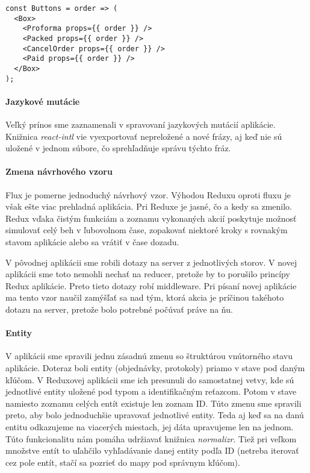 \begin{lstlisting}[caption=Pole komponentov v JavaScripte s použitím knižnice Redux]
const Buttons = order => (
  <Box>
    <Proforma props={{ order }} />
    <Packed props={{ order }} />
    <CancelOrder props={{ order }} />
    <Paid props={{ order }} />
  </Box>
);
\end{lstlisting}

\paragraph{Jazykové mutácie}
Veľký prínos sme zaznamenali v spravovaní jazykových mutácií aplikácie. Knižnica \emph{react-intl} vie vyexportovať nepreložené a nové frázy, aj keď nie sú uložené v jednom súbore, čo sprehľadňuje správu týchto fráz.

\paragraph{Zmena návrhového vzoru}
Flux je pomerne jednoduchý návrhový vzor. Výhodou Reduxu oproti fluxu je však ešte viac prehladná aplikácia. Pri Reduxe je jasné, čo a kedy sa zmenilo. Redux vďaka čistým funkciám a zoznamu vykonaných akcií poskytuje možnosť simulovať celý beh v ľubovolnom čase, zopakovať niektoré kroky s rovnakým stavom aplikácie alebo sa vrátiť v čase dozadu.

V pôvodnej aplikácii sme robili dotazy na server z jednotlivých storov. V novej aplikácii sme toto nemohli nechať na reducer, pretože by to porušilo princípy Redux aplikácie. Preto tieto dotazy robí middleware. Pri písaní novej aplikácie ma tento vzor naučil zamýšľať sa nad tým, ktorá akcia je príčinou takéhoto dotazu na server, pretože bolo potrebné počúvať práve na ňu.

%


\paragraph{Entity}%
V aplikácii sme spravili jednu zásadnú zmenu so štruktúrou vnútorného stavu aplikácie. Doteraz boli entity (objednávky, protokoly) priamo v stave pod daným kľúčom. 
V Reduxovej aplikácii sme ich presunuli do samostatnej vetvy, kde sú jednotlivé entity uložené pod typom a identifikačným reťazcom. Potom v stave namiesto zoznamu celých entít existuje len zoznam ID. 
Túto zmenu sme spravili preto, aby bolo jednoduchšie upravovať jednotlivé entity. Teda aj keď sa na danú entitu odkazujeme na viacerých miestach, jej dáta upravujeme len na jednom. Túto funkcionalitu nám pomáha udržiavať knižnica \emph{normalizr}.
Tiež pri veľkom množstve entít to uľahčilo vyhľadávanie danej entity podľa ID (netreba iterovať cez pole entít, stačí sa pozrieť do mapy pod správnym kľúčom).

